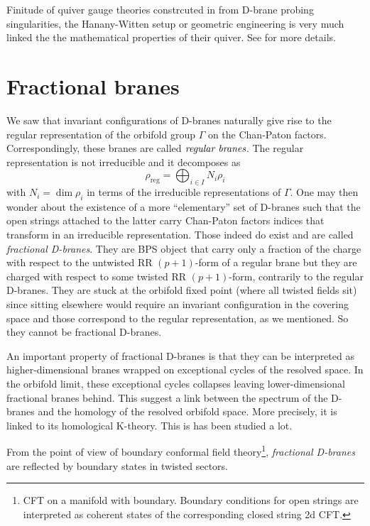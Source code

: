 \documentclass{worksheetclass}
\begin{document}
    Finitude of quiver gauge theories constrcuted in from D-brane probing singularities, the Hanany-Witten setup or geometric engineering is very much linked the the mathematical properties of their quiver. See \cite{Hanany:1999sp} for more details.

\section{Fractional branes}
    
    We saw that invariant configurations of D-branes naturally give rise to the regular representation of the orbifold group $\Gamma$ on the Chan-Paton factors. Correspondingly, these branes are called $\emph{regular branes}$. The regular representation is not irreducible and it decomposes as
    \begin{equation}
        \rho_{\text{reg}}=\bigoplus_{i\in I} N_i\rho_i
    \end{equation}
    with $N_i=\dim\rho_i$ in terms of the irreducible representations of $\Gamma$. One may then wonder about the existence of a more ``elementary'' set of D-branes such that the open strings attached to the latter carry Chan-Paton factors indices that transform in an irreducible representation. Those indeed do exist and are called \emph{fractional D-branes}. They are BPS object that carry only a fraction of the charge with respect to the untwisted RR $(p+1)$-form of a regular brane but they are charged with respect to some twisted RR $(p+1)$-form, contrarily to the regular D-branes. They are stuck at the orbifold fixed point (where all twisted fields sit) since sitting elsewhere would require an invariant configuration in the covering space and those correspond to the regular representation, as we mentioned. So they cannot be fractional D-branes.

    An important property of fractional D-branes is that they can be interpreted as higher-dimensional branes wrapped on exceptional cycles of the resolved space. In the orbifold limit, these exceptional cycles collapses leaving lower-dimensional fractional branes behind. This suggest a link between the spectrum of the D-branes and the homology of the resolved orbifold space. More precisely, it is linked to its homological K-theory. This is has been studied a lot.

    From the point of view of boundary conformal field theory\footnote{CFT on a manifold with boundary. Boundary conditions for open strings are interpreted as coherent states of the corresponding closed string 2d CFT.}, \emph{fractional D-branes} are reflected by boundary states in twisted sectors.
\end{document}
